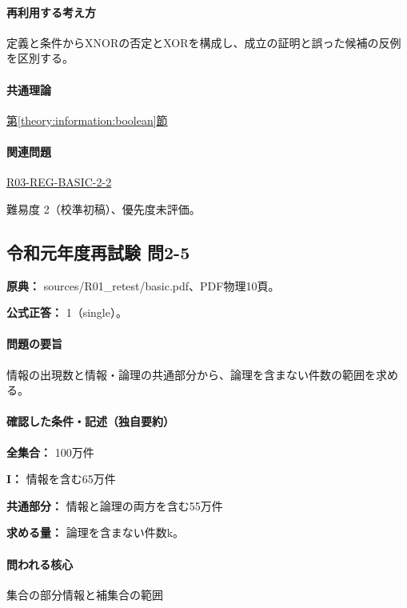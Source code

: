 \paragraph{再利用する考え方} 定義と条件からXNORの否定とXORを構成し、成立の証明と誤った候補の反例を区別する。

\paragraph{共通理論} \hyperref[theory:information:boolean]{第\ref*{theory:information:boolean}節}

\paragraph{関連問題} \hyperref[q:r03-reg-basic-2-2]{R03-REG-BASIC-2-2}

\par 難易度 2（校準初稿）、優先度未評価。

\subsection{令和元年度再試験 問2-5}
\label{q:r01-ret-basic-2-5}

\noindent\textbf{原典：} sources/R01\_retest/basic.pdf、PDF物理10頁。

\textbf{公式正答：} 1（single）。

\paragraph{問題の要旨} 情報の出現数と情報・論理の共通部分から、論理を含まない件数の範囲を求める。

\paragraph{確認した条件・記述（独自要約）}\mbox{}\par

\noindent\textbf{全集合：} 100万件\par

\noindent\textbf{I：} 情報を含む65万件\par

\noindent\textbf{共通部分：} 情報と論理の両方を含む55万件\par

\noindent\textbf{求める量：} 論理を含まない件数k。\par

\paragraph{問われる核心} 集合の部分情報と補集合の範囲

